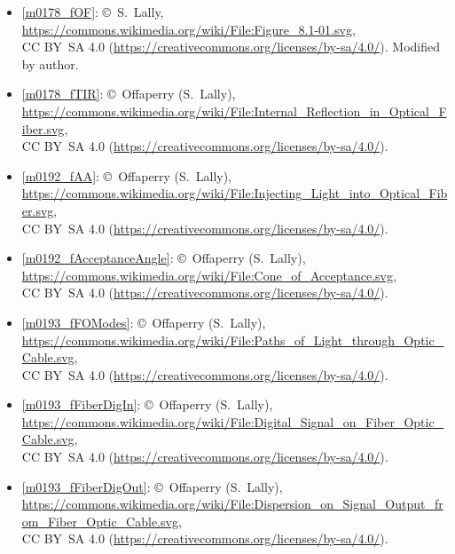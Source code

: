 \begin{itemize}

\item[Fig.] \label{m0178_fOF_Credit}
  \ref{m0178_fOF}:
  \copyright~S.\ Lally, 
  \url{https://commons.wikimedia.org/wiki/File:Figure_8.1-01.svg},\\ 
  CC BY~SA 4.0 (\url{https://creativecommons.org/licenses/by-sa/4.0/}).
  Modified by author.

\item[Fig.] \label{m0178_fTIR_Credit}
  \ref{m0178_fTIR}:
  \copyright~Offaperry (S.\ Lally), 
  \url{https://commons.wikimedia.org/wiki/File:Internal_Reflection_in_Optical_Fiber.svg},\\ 
  CC BY~SA 4.0 (\url{https://creativecommons.org/licenses/by-sa/4.0/}).

\item[Fig.] \label{m0192_fAA_Credit}
  \ref{m0192_fAA}:
  \copyright~Offaperry (S.\ Lally), 
  \url{https://commons.wikimedia.org/wiki/File:Injecting_Light_into_Optical_Fiber.svg},\\ 
  CC BY~SA 4.0 (\url{https://creativecommons.org/licenses/by-sa/4.0/}).

\item[Fig.] \label{m0192_fAcceptanceAngle_Credit}
  \ref{m0192_fAcceptanceAngle}:
  \copyright~Offaperry (S.\ Lally), 
  \url{https://commons.wikimedia.org/wiki/File:Cone_of_Acceptance.svg},\\ 
  CC BY~SA 4.0 (\url{https://creativecommons.org/licenses/by-sa/4.0/}).

\item[Fig.] \label{m0193_fFOModes_Credit}
  \ref{m0193_fFOModes}:
  \copyright~Offaperry (S.\ Lally), 
  \url{https://commons.wikimedia.org/wiki/File:Paths_of_Light_through_Optic_Cable.svg},\\ 
  CC BY~SA 4.0 (\url{https://creativecommons.org/licenses/by-sa/4.0/}).

\item[Fig.] \label{m0193_fFiberDigIn_Credit}
  \ref{m0193_fFiberDigIn}:
  \copyright~Offaperry (S.\ Lally), 
  \url{https://commons.wikimedia.org/wiki/File:Digital_Signal_on_Fiber_Optic_Cable.svg},\\ 
  CC BY~SA 4.0 (\url{https://creativecommons.org/licenses/by-sa/4.0/}).

\item[Fig.] \label{m0193_fFiberDigOut_Credit}
  \ref{m0193_fFiberDigOut}:
  \copyright~Offaperry (S.\ Lally), 
  \url{https://commons.wikimedia.org/wiki/File:Dispersion_on_Signal_Output_from_Fiber_Optic_Cable.svg},\\ 
  CC BY~SA 4.0 (\url{https://creativecommons.org/licenses/by-sa/4.0/}).

\end{itemize}

\twocolumn
